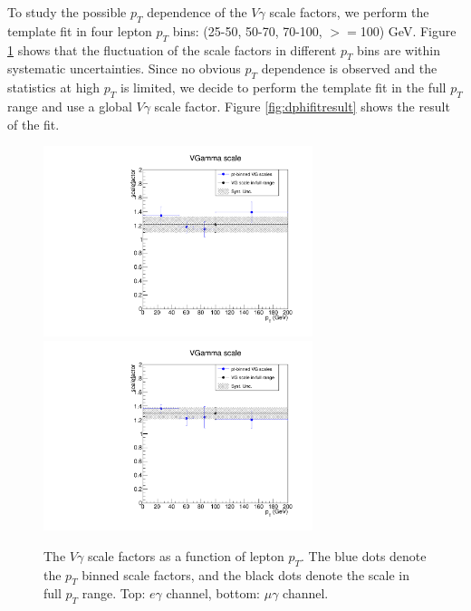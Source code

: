 \documentclass[thesis.tex]{subfiles}
\renewcommand\_{\textunderscore\allowbreak}
\begin{document}
To study the possible $p_T$ dependence of the $V\gamma$ scale factors, we perform the template fit in four lepton $p_T$ bins: (25-50, 50-70, 70-100, $>=$100) GeV. Figure \ref{fig:dphiptdependence} shows that the fluctuation of the scale factors in different $p_T$ bins are within systematic uncertainties. Since no obvious $p_T$ dependence is observed and the statistics at high $p_T$ is limited, we decide to perform the template fit in the full $p_T$ range and use a global $V\gamma$ scale factor. Figure \ref{fig:dphifitresult} shows the result of the fit. 
\begin{figure}[hbtp]
  \centering
    \includegraphics[width=0.7\textwidth]{Figures/scale_ptDependence_eg.pdf} \\
    \includegraphics[width=0.7\textwidth]{Figures/scale_ptDependence_mg.pdf}
  \caption{The $V\gamma$ scale factors as a function of lepton $p_T$. The blue dots denote the $p_T$ binned scale factors, and the black dots denote the scale in full $p_T$ range. Top: $e\gamma$ channel, bottom: $\mu\gamma$ channel. }
    \label{fig:dphiptdependence}
\end{figure}
\end{document}
